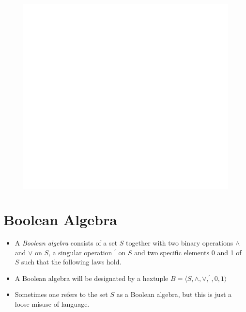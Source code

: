\documentclass[]{book}
\begin{document}
\begin{figure}

{\centering \includegraphics[width=1\linewidth]{figure/boxC411-1} 

}

\end{figure}

\newpage

\hypertarget{boolean-algebra-1}{%
\section{Boolean Algebra}\label{boolean-algebra-1}}

\begin{itemize}
\item
  A \emph{Boolean algebra} consists of a set \(S\) together with two binary operations \(\land\) and \(\lor\) on \(S\), a singular operation \(^\prime\) on \(S\) and two specific elements 0 and 1 of \(S\) such that the following laws hold.
\item
  A Boolean algebra will be designated by a hextuple \(B = \langle S, \land, \lor, ^\prime, 0,1\rangle\)
\item
  Sometimes one refers to the set \(S\) as a Boolean algebra, but this is just a loose misuse of language.
\end{itemize}
\end{document}
